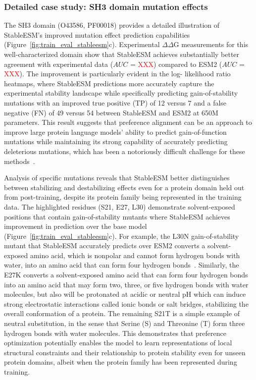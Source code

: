 \documentclass[]{fairmeta}
\begin{document}
\subsubsection{Detailed case study: SH3 domain mutation effects}
The SH3 domain (O43586, PF00018) provides a detailed illustration of 
StableESM's improved mutation effect prediction capabilities 
(Figure~\ref{fig:train_eval_stableesm}c). Experimental $\Delta\Delta$G 
measurements for this well-characterized domain show that StableESM achieves 
substantially better agreement with experimental data ($AUC$ = \textcolor{red}{XXX}) compared 
to ESM2 ($AUC$ = \textcolor{red}{XXX}). The improvement is particularly evident in the log-
likelihood ratio heatmaps, where StableESM predictions more accurately capture 
the experimental stability landscape while specifically predicting gain-of-stability mutations with an improved true positive (TP) of 12 versus 7 and a false negative (FN) of 49 versus 54 between StableESM and ESM2 at 650M parameters. This result suggests that preference alignment can be an approach to improve large protein language models' ability to predict gain-of-function mutations while maintaining its strong capability of accurately predicting deleterious mutations, which has been a notoriously difficult challenge for these methods~\citep{ertelt2025self}.

Analysis of specific mutations reveals that StableESM better distinguishes 
between stabilizing and destabilizing effects even for a protein domain held out from post-training, despite its protein family being represented in the training data. The highlighted 
residues (S21, E27, L30) demonstrate solvent-exposed positions that contain gain-of-stability mutants where StableESM achieves improvement in prediction over the base model (Figure~\ref{fig:train_eval_stableesm}c). For example, the L30N gain-of-stability mutant that StableESM accurately predicts over ESM2 converts a solvent-exposed amino acid, which is nonpolar and cannot form hydrogen bonds with water, into an amino acid that can form four hydrogen bonds~\citep{qing2022protein}. Similarly, the E27K converts a solvent-exposed amino acid that can form four hydrogen bonds into an amino acid that may form two, three, or five hydrogen bonds with water molecules, but also will be protonated at acidic or neutral pH which can induce strong electrostatic interactions called ionic bonds or salt bridges, stabilizing the overall conformation of a protein. The remaining S21T is a simple example of neutral substitution, in the sense that Serine (S) and Threonine (T) form three hydrogen bonds with water molecules. This demonstrates that preference optimization potentially enables the model to learn representations of local structural constraints and their relationship to protein stability even for unseen protein domains, albeit when the protein family has been represented during training.
\end{document}
